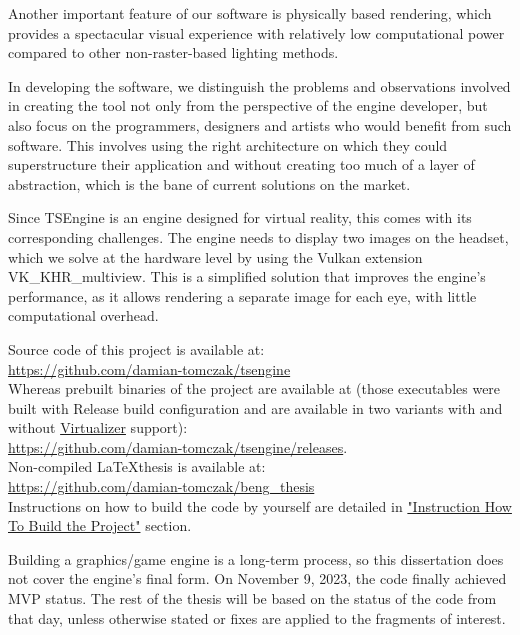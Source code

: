 Another important feature of our software is physically based rendering, which provides a spectacular visual experience with relatively low computational power compared to other non-raster-based lighting methods.

In developing the software, we distinguish the problems and observations involved in creating the tool not only from the perspective of the engine developer, but also focus on the programmers, designers and artists who would benefit from such software. This involves using the right architecture on which they could superstructure their application and without creating too much of a layer of abstraction, which is the bane of current solutions on the market.

Since TSEngine is an engine designed for virtual reality, this comes with its corresponding challenges. The engine needs to display two images on the headset, which we solve at the hardware level by using the Vulkan extension VK\_KHR\_multiview. This is a simplified solution that improves the engine's performance, as it allows rendering a separate image for each eye, with little computational overhead.

Source code of this project is available at:\\
\href{https://github.com/damian-tomczak/tsengine}{https://github.com/damian-tomczak/tsengine}\\
Whereas prebuilt binaries of the project are available at (those executables were built with Release build configuration and are available in two variants with and without \hyperref[sec:hardware]{Virtualizer} support):\\
\href{https://github.com/damian-tomczak/tsengine/releases}{https://github.com/damian-tomczak/tsengine/releases}.\\
Non-compiled \LaTeX thesis is available at:\\
\href{https://github.com/damian-tomczak/beng_thesis}{https://github.com/damian-tomczak/beng\_thesis}\\
Instructions on how to build the code by yourself are detailed in \hyperref[sec:how_to_run]{"Instruction How To Build the Project"} section.

Building a graphics/game engine is a long-term process, so this dissertation does not cover the engine's final form.
On November 9, 2023, the code finally achieved MVP status. The rest of the thesis will be based on the status of the code from that day, unless otherwise stated or fixes are applied to the fragments of interest.
\newpage
